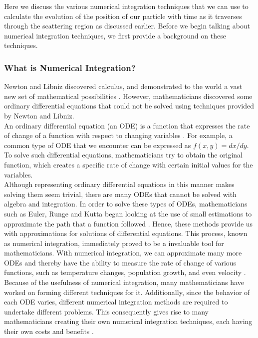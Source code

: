 \documentclass[12pt]{article} %
\begin{document}
Here we discuss the various numerical integration techniques that we can use to calculate the evolution of the position of our particle with time as it traverses through the scattering region as discussed earlier. Before we begin talking about numerical integration techniques, we first provide a background on these techniques.

\subsubsection{What is Numerical Integration?}

 Newton and Libniz discovered calculus, and demonstrated to the world a vast new set of mathematical possibilities \cite{ODE}. However, mathematicians discovered some ordinary differential equations that could not be solved using techniques provided by Newton and Libniz. \\


 An ordinary differential equation (an ODE) is a function that expresses the rate of change of a function with respect to changing variables \cite{ODE}. For example, a common type of ODE that we encounter can be expressed as $f (x, y) = dx /dy$. To solve such differential equations, mathematicians try to obtain the original function, which creates a specific rate of change with certain initial values for the variables. \\

 Although representing ordinary differential equations in this manner makes solving them seem trivial, there are many ODEs that cannot be solved with algebra and integration. In order to solve these types of ODEs, mathematicians such as Euler, Runge and Kutta began looking at the use of small estimations to approximate the path that a function followed \cite{ODE}. Hence, these methods provide us with approximations for solutions of differential equations. This process, known as numerical integration, immediately proved to be a invaluable tool for mathematicians. With numerical integration, we can approximate many more ODEs and thereby have the ability to measure the rate of change of various functions, such as temperature changes, population growth, and even velocity \cite{ODE}. \\
 

 Because of the usefulness of numerical integration, many mathematicians have worked on forming different techniques for it. Additionally, since the behavior of each ODE varies,  different numerical integration methods are required to undertake different problems. This consequently gives rise to many mathematicians creating their own numerical integration techniques, each having their own costs and benefits \cite{ODE}. \\
\end{document}
